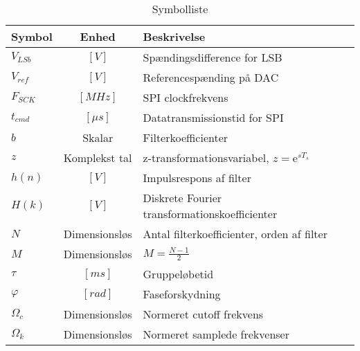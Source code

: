 \begin{table}[ht!]
	\caption{Symbolliste}
	\label{tab:symbolliste2}
	\begin{threeparttable}
		\begin{tabular}{l c p{}}
			\toprule
			\textbf{Symbol}      &
			\textbf{Enhed} & \textbf{Beskrivelse} \\
			\midrule
			$V_{LSb}$ & $\left[\si{V}\right]$ & Spændingsdifference for LSB\\
			$V_{ref}$ & $\left[\si{V}\right]$ & Referencespænding på DAC\\
			$F_{SCK}$ & $\left[\si{MHz}\right]$ & SPI clockfrekvens\\
			$t_{cmd}$ & $\left[\si{\mu s}\right]$ & Datatransmissionstid for SPI\\	
			$b$ & Skalar & Filterkoefficienter \\
			$z$ & Komplekst tal & z-transformationsvariabel, $z = \mathrm{e}^{sT_s}$\\
			$h(n)$ & $\left[\si{V}\right]$ & Impulsrespons af filter \\
			$H(k)$ & $\left[\si{V}\right]$ & Diskrete Fourier transformationskoefficienter\\
			$N$ & Dimensionsløs & Antal filterkoefficienter, orden af filter\\
			$M$ & Dimensionsløs & $M = \frac{N - 1}{2}$\\
			$\tau$ & $\left[\si{ms}\right]$ & Gruppeløbetid\\
			$\varphi$ & $\left[\si{rad}\right]$ & Faseforskydning\\
			$\Omega_c$ & Dimensionsløs & Normeret cutoff frekvens\\
			$\Omega_k$ & Dimensionsløs & Normeret samplede frekvenser\\		
			
		\end{tabular}
	\end{threeparttable}
\end{table}
